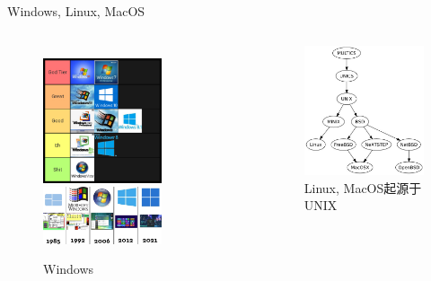 

\begin{frame}{Windows, Linux, MacOS}
    \begin{columns}
        \begin{figure}
            \centering
            \includegraphics[width=3.5cm]{Images/windows.jpg}
            \includegraphics[width=3.5cm]{Images/windows2.jpg}
            \caption{Windows}
        \end{figure}

        \begin{figure}
            \centering
            \includegraphics[width=5cm]{Images/unix.jpg}
            \caption{Linux, MacOS起源于UNIX}
        \end{figure}
    \end{columns}
\end{frame}

